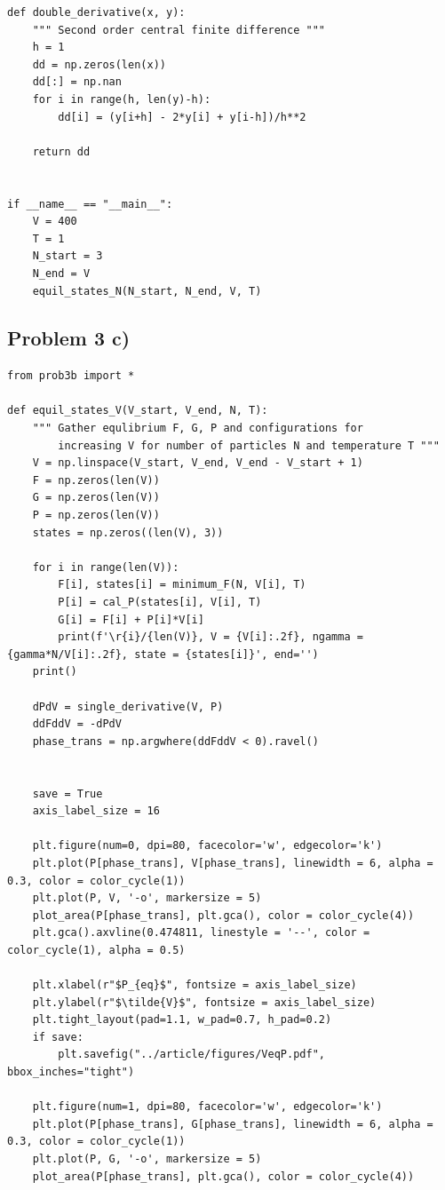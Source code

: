 \documentclass[reprint, amsmath, amssymb, aps, onecolumn]{revtex4-2}
\begin{document}
\begin{verbatim}
def double_derivative(x, y):
    """ Second order central finite difference """
    h = 1
    dd = np.zeros(len(x))
    dd[:] = np.nan
    for i in range(h, len(y)-h):
        dd[i] = (y[i+h] - 2*y[i] + y[i-h])/h**2

    return dd


if __name__ == "__main__":
    V = 400
    T = 1
    N_start = 3
    N_end = V
    equil_states_N(N_start, N_end, V, T)

\end{verbatim}

\clearpage
\subsection{Problem 3 c)}\label{sec:code_3c}
\begin{verbatim}
from prob3b import *

def equil_states_V(V_start, V_end, N, T):
    """ Gather equlibrium F, G, P and configurations for
        increasing V for number of particles N and temperature T """
    V = np.linspace(V_start, V_end, V_end - V_start + 1)
    F = np.zeros(len(V))
    G = np.zeros(len(V))
    P = np.zeros(len(V))
    states = np.zeros((len(V), 3))

    for i in range(len(V)):
        F[i], states[i] = minimum_F(N, V[i], T)
        P[i] = cal_P(states[i], V[i], T)
        G[i] = F[i] + P[i]*V[i]
        print(f'\r{i}/{len(V)}, V = {V[i]:.2f}, ngamma = {gamma*N/V[i]:.2f}, state = {states[i]}', end='')
    print()

    dPdV = single_derivative(V, P)
    ddFddV = -dPdV
    phase_trans = np.argwhere(ddFddV < 0).ravel()


    save = True
    axis_label_size = 16

    plt.figure(num=0, dpi=80, facecolor='w', edgecolor='k')
    plt.plot(P[phase_trans], V[phase_trans], linewidth = 6, alpha = 0.3, color = color_cycle(1))
    plt.plot(P, V, '-o', markersize = 5)
    plot_area(P[phase_trans], plt.gca(), color = color_cycle(4))
    plt.gca().axvline(0.474811, linestyle = '--', color = color_cycle(1), alpha = 0.5)

    plt.xlabel(r"$P_{eq}$", fontsize = axis_label_size)
    plt.ylabel(r"$\tilde{V}$", fontsize = axis_label_size)
    plt.tight_layout(pad=1.1, w_pad=0.7, h_pad=0.2)
    if save:
        plt.savefig("../article/figures/VeqP.pdf", bbox_inches="tight")

    plt.figure(num=1, dpi=80, facecolor='w', edgecolor='k')
    plt.plot(P[phase_trans], G[phase_trans], linewidth = 6, alpha = 0.3, color = color_cycle(1))
    plt.plot(P, G, '-o', markersize = 5)
    plot_area(P[phase_trans], plt.gca(), color = color_cycle(4))


\end{verbatim}
\end{document}
